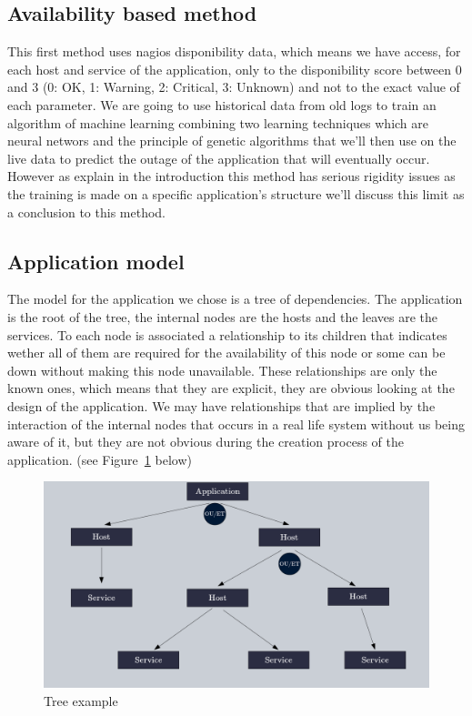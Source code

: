 \documentclass[10pt,a4paper,oneside]{article}
\begin{document}
\begin{multicols}{2}
\section{Availability based method}
This first method uses nagios disponibility data, which means we have access, for each host and service of the application, only to the disponibility score between 0 and 3 (0: OK, 1: Warning, 2: Critical, 3: Unknown) and not to the exact value of each parameter. We are going to use historical data from old logs to train an algorithm of machine learning combining two learning techniques which are neural networs and the principle of genetic algorithms that we'll then use on the live data to predict the outage of the application that will eventually occur. However as explain in the introduction this method has serious rigidity issues as the training is made on a specific application's structure we'll discuss this limit as a conclusion to this method.
\subsection{Application model}
The model for the application we chose is a tree of dependencies. The application is the root of the tree, the internal nodes are the hosts and the leaves are the services. To each node is associated a relationship to its children that indicates wether all of them are required for the availability of this node or some can be down without making this node unavailable. These relationships are only the known ones, which means that they are explicit, they are obvious looking at the design of the application. We may have relationships that are implied by the interaction of the internal nodes that occurs in a real life system without us being aware of it, but they are not obvious during the creation process of the application. (see Figure~\ref{exampletree} below)
\end{multicols}

\vspace{0.8cm}

\begin{figure}[!h]
\centering
\includegraphics[scale=0.35]{./images/arbrerelations.png}
\caption{Tree example}
\label{exampletree}
\end{figure}
\end{document}
